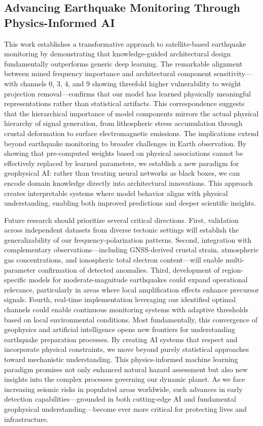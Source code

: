 \documentclass[fleqn,10pt]{wlscirep_mdpi_style}
\begin{document}
\subsection{Advancing Earthquake Monitoring Through Physics-Informed AI}
This work establishes a transformative approach to satellite-based earthquake monitoring by demonstrating that knowledge-guided architectural design fundamentally outperforms generic deep learning. The remarkable alignment between mined frequency importance and architectural component sensitivity—with channels 0, 3, 4, and 9 showing threefold higher vulnerability to weight projection removal—confirms that our model has learned physically meaningful representations rather than statistical artifacts. This correspondence suggests that the hierarchical importance of model components mirrors the actual physical hierarchy of signal generation, from lithospheric stress accumulation through crustal deformation to surface electromagnetic emissions.
The implications extend beyond earthquake monitoring to broader challenges in Earth observation. By showing that pre-computed weights based on physical associations cannot be effectively replaced by learned parameters, we establish a new paradigm for geophysical AI: rather than treating neural networks as black boxes, we can encode domain knowledge directly into architectural innovations. This approach creates interpretable systems where model behavior aligns with physical understanding, enabling both improved predictions and deeper scientific insights.

Future research should prioritize several critical directions. First, validation across independent datasets from diverse tectonic settings will establish the generalizability of our frequency-polarization patterns. Second, integration with complementary observations—including GNSS-derived crustal strain, atmospheric gas concentrations, and ionospheric total electron content—will enable multi-parameter confirmation of detected anomalies. Third, development of region-specific models for moderate-magnitude earthquakes could expand operational relevance, particularly in areas where local amplification effects enhance precursor signals. Fourth, real-time implementation leveraging our identified optimal channels could enable continuous monitoring systems with adaptive thresholds based on local environmental conditions.
Most fundamentally, this convergence of geophysics and artificial intelligence opens new frontiers for understanding earthquake preparation processes. By creating AI systems that respect and incorporate physical constraints, we move beyond purely statistical approaches toward mechanistic understanding. This physics-informed machine learning paradigm promises not only enhanced natural hazard assessment but also new insights into the complex processes governing our dynamic planet. As we face increasing seismic risks in populated areas worldwide, such advances in early detection capabilities—grounded in both cutting-edge AI and fundamental geophysical understanding—become ever more critical for protecting lives and infrastructure.
\end{document}
